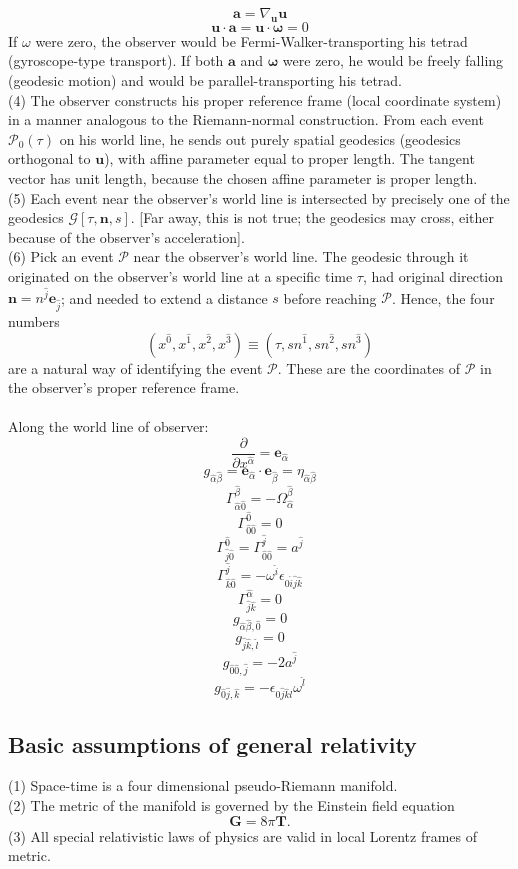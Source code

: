\documentclass{article}
\begin{document}
\[\mathbf{a} = \nabla_{\mathbf{u}} \mathbf{u}\]
\[\mathbf{u} \cdot \mathbf{a} = \mathbf{u} \cdot \mathbf{\omega} = 0\]
If $\omega$ were zero, the observer would be Fermi-Walker-transporting his tetrad (gyroscope-type transport). If both $\mathbf{a}$ and $\mathbf{\omega}$ were zero, he would be freely falling (geodesic motion) and would be parallel-transporting his tetrad.\\
(4) The observer constructs his proper reference frame (local coordinate system) in a manner analogous to the Riemann-normal construction. From each event $\mathcal{P}_0(\tau)$ on his world line, he sends out purely spatial geodesics (geodesics orthogonal to $\mathbf{u}$), with affine parameter equal to proper length. The tangent vector has unit length, because the chosen affine
parameter is proper length.\\
(5) Each event near the observer's world line is intersected by precisely one of the geodesics $\mathcal{G}[\tau,\mathbf{n},s]$. [Far away, this is not true; the geodesics may cross, either
because of the observer's acceleration].\\
(6) Pick an event $\mathcal{P}$ near the observer's world line. The geodesic through it originated on the observer's world line at a specific time $\tau$, had original direction $\mathbf{n} = n^{\hat{j}} \mathbf{e}_{\hat{j}}$; and needed to extend a distance $s$ before reaching $\mathcal{P}$. Hence, the four numbers
\[(x^{\hat{0}},x^{\hat{1}},x^{\hat{2}},x^{\hat{3}}) \equiv (\tau,s n^{\hat{1}},s n^{\hat{2}},s n^{\hat{3}})\]
are a natural way of identifying the event $\mathcal{P}$. These are the coordinates of $\mathcal{P}$ in the observer's proper reference frame.\\ \\
Along the world line of observer:
\[\frac{\partial}{\partial x^{\hat{\alpha}}} = \mathbf{e}_{\hat{\alpha}}\]
\[g_{\hat{\alpha} \hat{\beta}} = \mathbf{e}_{\hat{\alpha}} \cdot \mathbf{e}_{\hat{\beta}} = \eta_{\hat{\alpha}\hat{\beta}}\]
\[\Gamma^{\hat{\beta}}_{\hat{\alpha} \hat{0}} = - \Omega^{\hat{\beta}}_{\hat{\alpha}} \]
\[\Gamma^{\hat{0}}_{\hat{0} \hat{0}} =0\]
\[\Gamma^{\hat{0}}_{\hat{j} \hat{0}} = \Gamma^{\hat{j}}_{\hat{0} \hat{0}} = a^{\hat{j}} \]
\[\Gamma^{\hat{j}}_{\hat{k} \hat{0}} = -\omega^{\hat{i}} \epsilon_{0 \hat{i} \hat{j} \hat{k}}\]
\[\Gamma^{\hat{\alpha}}_{\hat{j} \hat{k}} = 0 \]
\[g_{\hat{\alpha} \hat{\beta},\hat{0}} = 0\]
\[g_{\hat{j} \hat{k},\hat{l}} = 0\]
\[g_{\hat{0} \hat{0},\hat{j}} = -2 a^{\hat{j}}\]
\[g_{\hat{0} \hat{j},\hat{k}} = -\epsilon_{0 \hat{j} \hat{k} \hat{l}} \omega^{\hat{l}}\]
\subsection{Basic assumptions of general relativity}
(1) Space-time is a four dimensional pseudo-Riemann manifold.\\
(2) The metric of the manifold is governed by the Einstein field equation
\[\mathbf{G} = 8\pi\mathbf{T}.\]
(3) All special relativistic laws of physics are valid in local Lorentz frames of metric.\\
\end{document}
